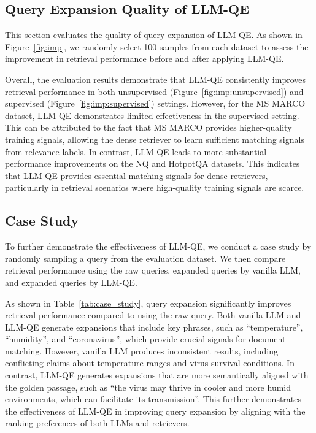 \subsection{Query Expansion Quality of LLM-QE}\label{app:analysis}
This section evaluates the quality of query expansion of LLM-QE. As shown in Figure~\ref{fig:imp}, we randomly select 100 samples from each dataset to assess the improvement in retrieval performance before and after applying LLM-QE.

Overall, the evaluation results demonstrate that LLM-QE consistently improves retrieval performance in both unsupervised (Figure~\ref{fig:imp:unsupervised}) and supervised (Figure~\ref{fig:imp:supervised}) settings. However, for the MS MARCO dataset, LLM-QE demonstrates limited effectiveness in the supervised setting. This can be attributed to the fact that MS MARCO provides higher-quality training signals, allowing the dense retriever to learn sufficient matching signals from relevance labels. In contrast, LLM-QE leads to more substantial performance improvements on the NQ and HotpotQA datasets. This indicates that LLM-QE provides essential matching signals for dense retrievers, particularly in retrieval scenarios where high-quality training signals are scarce.


\subsection{Case Study}\label{app:case_study}

To further demonstrate the effectiveness of LLM-QE, we conduct a case study by randomly sampling a query from the evaluation dataset. We then compare retrieval performance using the raw queries, expanded queries by vanilla LLM, and expanded queries by LLM-QE.

As shown in Table~\ref{tab:case_study}, query expansion significantly improves retrieval performance compared to using the raw query. Both vanilla LLM and LLM-QE generate expansions that include key phrases, such as ``temperature'', ``humidity'', and ``coronavirus'', which provide crucial signals for document matching. However, vanilla LLM produces inconsistent results, including conflicting claims about temperature ranges and virus survival conditions. In contrast, LLM-QE generates expansions that are more semantically aligned with the golden passage, such as ``the virus may thrive in cooler and more humid environments, which can facilitate its transmission''. This further demonstrates the effectiveness of LLM-QE in improving query expansion by aligning with the ranking preferences of both LLMs and retrievers.


